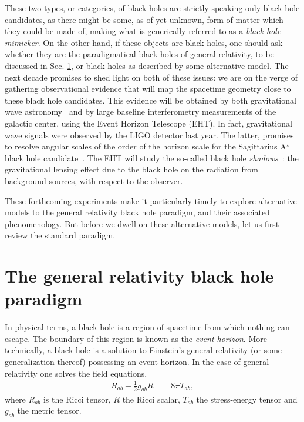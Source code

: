 These two types, or categories, of black holes are strictly speaking only black hole candidates, 
as there might be some, as of yet unknown, form of matter which they could be made of, making what is generically referred to as a \textit{black hole mimicker}.
On the other hand, if these objects are black holes, one should ask whether they are the paradigmatical black holes of general relativity, to be discussed in Sec. \ref{sec:bh_gr}, or black holes as described by some alternative model.
The next decade promises to shed light on both of these issues: we are on the verge of gathering observational evidence that will map the spacetime geometry close to these black hole candidates.
This evidence will be obtained by both gravitational wave astronomy~\cite{Hild:2011np,Hobbs:2009yy,Seoane:2013qna} and by large baseline interferometry measurements of the galactic center, using the Event Horizon Telescope (EHT).
In fact, gravitational wave signals were observed by the LIGO detector last year\cite{Abbott:2016blz,Abbott:2016nmj}.
The latter, promises to resolve angular scales of the order of the horizon scale for the Sagittarius A$^\star$ black hole candidate~\cite{Loeb:2013lfa}.
The EHT will study the so-called black hole \textit{shadows}~\cite{Falcke:1999pj}: the gravitational lensing effect due to the black hole on the radiation from background sources, with respect to the observer.

These forthcoming experiments make it particularly timely to explore alternative models to the general relativity black hole paradigm, and their associated phenomenology.
But before we dwell on these alternative models, let us first review the standard paradigm.
\section{The general relativity black hole paradigm}
\label{sec:bh_gr}

In physical terms, a black hole is a region of spacetime from which nothing can escape.
The boundary of this region is known as the \textit{event horizon}.
More technically, a black hole is a solution to Einstein's general relativity (or some generalization thereof) possessing an event horizon.
In the case of general relativity one solves the field equations,
\begin{align}
  R_{ab} - \frac{1}{2}g_{ab}R  &= 8\pi T_{ab},
  \label{eqn:Einstein-eqns}
\end{align}
where $R_{ab}$ is the Ricci tensor, $R$ the Ricci scalar, $T_{ab}$ the stress-energy tensor and $g_{ab}$ the metric tensor.

